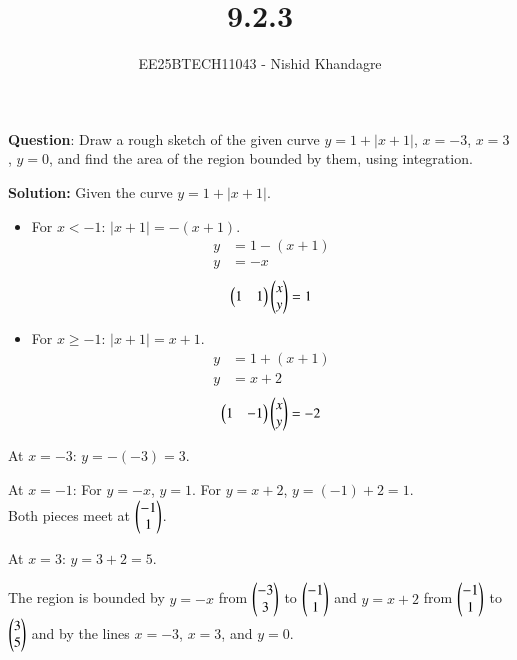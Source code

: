 \documentclass[journal]{IEEEtran}
\title{9.2.3}
\author{EE25BTECH11043 - Nishid Khandagre}
\begin{document}
\maketitle

\renewcommand{\thefigure}{\theenumi}
\renewcommand{\thetable}{\theenumi}


\textbf{Question}:
Draw a rough sketch of the given curve $y = 1 + |x + 1|$, $x = -3$, $x = 3$, $y = 0$, and
find the area of the region bounded by them, using integration.

\textbf{Solution: }
Given the curve $y = 1 + |x + 1|$.
\begin{itemize}
    \item For $x < -1$: $|x+1| = -(x+1)$.
    \begin{align}
        y &= 1 - (x+1) \\
        y &= -x
        \end{align}
        \begin{align}
        \begin{pmatrix}1&1\end{pmatrix}\begin{pmatrix}x\\y\end{pmatrix}=1
    \end{align}
    \item For $x \ge -1$: $|x+1| = x+1$.
    \begin{align}
        y &= 1 + (x+1) \\
        y &= x+2
        \end{align}
        \begin{align}
        \begin{pmatrix}1&-1\end{pmatrix}\begin{pmatrix}x\\y\end{pmatrix}=-2
    \end{align}
\end{itemize}

At $x=-3$: $y = -(-3) = 3$.

At $x=-1$: For $y=-x$, $y=1$. For $y=x+2$, $y=(-1)+2=1$.\\Both pieces meet at $\begin{pmatrix}-1\\1\end{pmatrix}$.

At $x=3$: $y = 3+2 = 5$.


The region is bounded by $y = -x$ from $\begin{pmatrix}-3\\3\end{pmatrix}$ to $\begin{pmatrix}-1\\1\end{pmatrix}$ and $y = x+2$ from $\begin{pmatrix}-1\\1\end{pmatrix}$ to $\begin{pmatrix}3\\5\end{pmatrix}$ and by the lines $x=-3$, $x=3$, and $y=0$.
\end{document}
